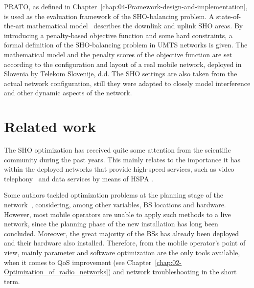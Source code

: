 \bigskip{}


PRATO, as defined in Chapter~\ref{chap:04-Framework-design-and-implementation},
is used as the evaluation framework of the SHO-balancing problem.
A state-of-the-art mathematical model~\cite{nawrocki2006understanding}
describes the downlink and uplink SHO areas. By introducing a penalty-based
objective function and some hard constraints, a formal definition
of the SHO-balancing problem in UMTS networks is given. The mathematical
model and the penalty scores of the objective function are set according
to the configuration and layout of a real mobile network, deployed
in Slovenia by Telekom Slovenije, d.d. The SHO settings are also taken
from the actual network configuration, still they were adapted to
closely model interference and other dynamic aspects of the network.




\section{Related work \label{sec:07-Related-work}}

The SHO optimization has received quite some attention from the scientific
community during the past years. This mainly relates to the importance
it has within the deployed networks that provide high-speed services,
such as video telephony~\cite{chen2010_impact_of_soft_handover}
and data services by means of HSPA \cite{chen2011_coverage_planning_for_optimizing_HSDPA,chen2008cpich}.

Some authors tackled optimization problems at the planning stage of
the network~\cite{Eisenblatter_OptimizationMethodsForUMTSRadioNetworkPlanning,ghosh2011_optimising_CDMA_cell_planning},
considering, among other variables, BS locations and hardware. However,
most mobile operators are unable to apply such methods to a live network,
since the planning phase of the new installation has long been concluded.
Moreover, the great majority of the BSs has already been deployed
and their hardware also installed. Therefore, from the mobile operator's
point of view, mainly parameter and software optimization are the
only tools available, when it comes to QoS improvement (see Chapter~\ref{chap:02-Optimization_of_radio_networks})
and network troubleshooting in the short term.

